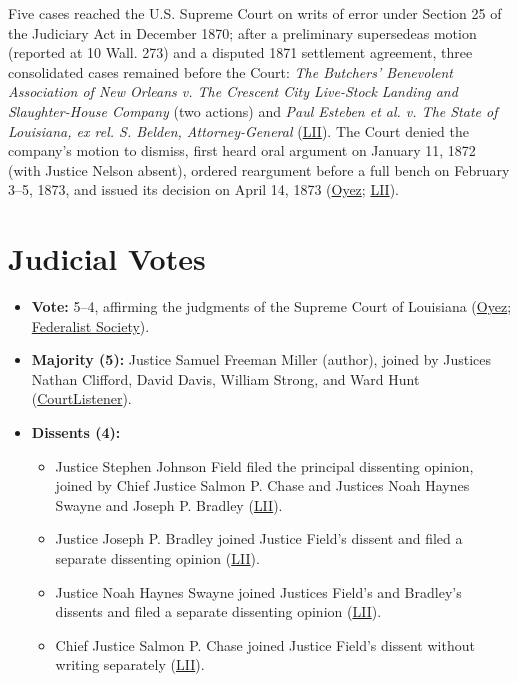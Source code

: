 \documentclass[12pt]{article}
\begin{document}
Five cases reached the U.S. Supreme Court on writs of error under Section 25 of the Judiciary Act in December 1870; after a preliminary supersedeas motion (reported at 10 Wall. 273) and a disputed 1871 settlement agreement, three consolidated cases remained before the Court: \textit{The Butchers' Benevolent Association of New Orleans v. The Crescent City Live-Stock Landing and Slaughter-House Company} (two actions) and \textit{Paul Esteben et al. v. The State of Louisiana, ex rel. S. Belden, Attorney-General} (\href{https://www.law.cornell.edu/supremecourt/text/83/36}{LII}). The Court denied the company's motion to dismiss, first heard oral argument on January 11, 1872 (with Justice Nelson absent), ordered reargument before a full bench on February 3--5, 1873, and issued its decision on April 14, 1873 (\href{https://www.oyez.org/cases/1850-1900/83us36}{Oyez}; \href{https://www.law.cornell.edu/supremecourt/text/83/36}{LII}).

\section{Judicial Votes}

\begin{itemize}
  \item \textbf{Vote:} 5--4, affirming the judgments of the Supreme Court of Louisiana (\href{https://www.oyez.org/cases/1850-1900/83us36}{Oyez}; \href{https://fedsoc.org/case/the-slaughter-house-cases}{Federalist Society}).
  \item \textbf{Majority (5):} Justice Samuel Freeman Miller (author), joined by Justices Nathan Clifford, David Davis, William Strong, and Ward Hunt (\href{https://www.courtlistener.com/opinion/88661/butchers-benevolent-assn-v-crescent-city-live-stock-landing/}{CourtListener}).
  \item \textbf{Dissents (4):}
    \begin{itemize}
      \item Justice Stephen Johnson Field filed the principal dissenting opinion, joined by Chief Justice Salmon P. Chase and Justices Noah Haynes Swayne and Joseph P. Bradley (\href{https://www.law.cornell.edu/supremecourt/text/83/36}{LII}).
      \item Justice Joseph P. Bradley joined Justice Field's dissent and filed a separate dissenting opinion (\href{https://www.law.cornell.edu/supremecourt/text/83/36}{LII}).
      \item Justice Noah Haynes Swayne joined Justices Field's and Bradley's dissents and filed a separate dissenting opinion (\href{https://www.law.cornell.edu/supremecourt/text/83/36}{LII}).
      \item Chief Justice Salmon P. Chase joined Justice Field's dissent without writing separately (\href{https://www.law.cornell.edu/supremecourt/text/83/36}{LII}).
    \end{itemize}
\end{itemize}
\end{document}
